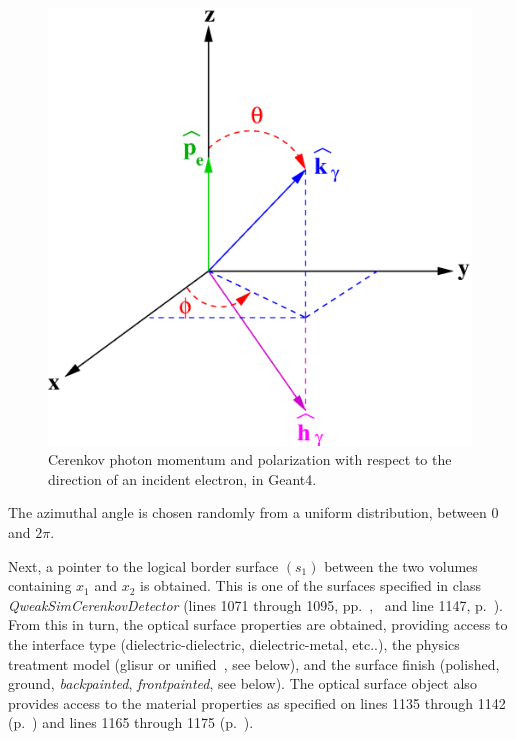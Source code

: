 \begin{figure}[h]
  \hspace{4cm}
  \includegraphics[scale=0.3]{./figures5/OpBoundary02.eps}
  \caption{Cerenkov photon momentum and polarization with respect to 
           the direction of an incident electron, in Geant4.}
           \label{fig:OPBOUND2}
\end{figure}
The azimuthal angle is chosen randomly from a uniform distribution,
between $0$ and $2\pi$.

Next, a pointer to the logical border surface $(s_1)$ between the two
volumes containing $x_1$ and $x_2$ is obtained. This is one of the
surfaces specified in class {\em QweakSimCerenkovDetector} (lines 1071
through 1095, pp.~\pageref{SourceV17},~\pageref{SourceV18} and line
1147, p.~\pageref{SourceV19}). From this in turn, the optical surface
properties are obtained, providing access to the interface type
(dielectric-dielectric, dielectric-metal, etc..), the physics
treatment model (glisur or unified~\cite{pp:LEVMOI}, see below), and
the surface finish (polished, ground, {\em backpainted}, {\em
frontpainted}, see below).  The optical surface object also provides
access to the material properties as specified on lines 1135 through
1142 (p.~\pageref{SourceV18}) and lines 1165 through 1175
(p.~\pageref{SourceV19}).


